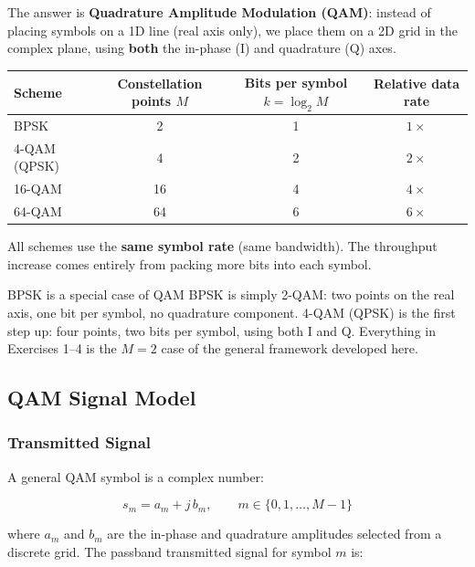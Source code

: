 The answer is \textbf{Quadrature Amplitude Modulation (QAM)}: instead of placing symbols on a 1D line (real axis only), we place them on a 2D grid in the complex plane, using \textbf{both} the in-phase (I) and quadrature (Q) axes.

\begin{center}
\renewcommand{\arraystretch}{1.4}
\begin{tabular}{lccc}
\hline
\textbf{Scheme} & \textbf{Constellation points $M$} & \textbf{Bits per symbol $k = \log_2 M$} & \textbf{Relative data rate} \\
\hline
BPSK & 2 & 1 & $1\times$ \\
4-QAM (QPSK) & 4 & 2 & $2\times$ \\
16-QAM & 16 & 4 & $4\times$ \\
64-QAM & 64 & 6 & $6\times$ \\
\hline
\end{tabular}
\end{center}

All schemes use the \textbf{same symbol rate} (same bandwidth). The throughput increase comes entirely from packing more bits into each symbol.

\begin{IntuitionBox}{BPSK is a special case of QAM}
BPSK is simply 2-QAM: two points on the real axis, one bit per symbol, no quadrature component. 4-QAM (QPSK) is the first step up: four points, two bits per symbol, using both I and Q. Everything in Exercises 1--4 is the $M = 2$ case of the general framework developed here.
\end{IntuitionBox}

\subsection{QAM Signal Model}

\subsubsection{Transmitted Signal}

A general QAM symbol is a complex number:

\begin{equation}
s_m = a_m + j\,b_m, \qquad m \in \{0, 1, \ldots, M-1\}
\end{equation}

where $a_m$ and $b_m$ are the in-phase and quadrature amplitudes selected from a discrete grid. The passband transmitted signal for symbol $m$ is:

